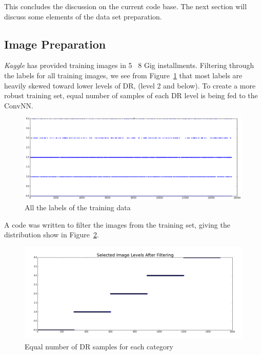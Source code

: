 \documentclass[letterpaper,12pt]{article}
\newcommand{\figref}[1]{Figure~\ref{#1}}
\begin{document}
This concludes the discussion on the current code base. The next section will discuss some elements of the data set preparation.

\subsection{Image Preparation}
\textit{Kaggle} has provided training images in  5 ~8 Gig installments. Filtering through the labels for all training images, we see from \figref{fullSample} that most labels are heavily skewed toward lower levels of DR, (level 2 and below). To create a more robust training set, equal number of samples of each DR level is being fed to the ConvNN. 

\begin{figure}[htbp]
\begin{center}
\includegraphics[scale=0.25]{images/FullSample.png}
\caption{All the labels of the training data}
\label{fullSample}
\end{center}
\end{figure}

A code was written to filter the images from the training set, giving the distribution show in \figref{filtered}.

\begin{figure}[htbp]
\begin{center}
\includegraphics[scale=0.25]{images/After_filtering.png}
\caption{Equal number of DR samples for each category}
\label{filtered}
\end{center}
\end{figure}
\end{document}
